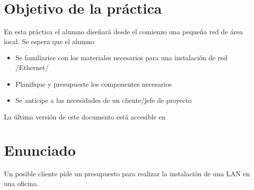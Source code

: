 

\usepackage{eurosym}


\setlength{\parindent}{1em}


\renewcommand{\hmwkTitle}{Cableado de oficina}
\renewcommand{\hmwkClass}{Planificación y Administración de Redes}

\usepackage{blindtext}






\primerapagina

\section{Objetivo de la práctica}
En esta práctica el alumno diseñará desde el comienzo una pequeña red de área local. Se espera que el alumno
\begin{itemize}
\item Se familiarice con los materiales necesarios para una instalación de red /Ethernet/
\item Planifique y presupueste los componentes necesarios
\item Se anticipe a las necesidades de un cliente/jefe de proyecto
\end{itemize}


La última versión de este documento está accesible en 

\section{Enunciado}
Un posible cliente pide un presupuesto para realizar la instalación de una LAN en una oficina.

